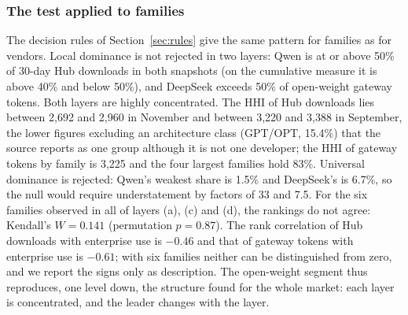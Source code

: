 \documentclass[11pt]{article}
\begin{document}
\subsubsection{The test applied to families} The decision rules of Section~\ref{sec:rules} give the same pattern for families as for vendors. Local dominance is not rejected in two layers: Qwen is at or above 50\% of 30-day Hub downloads in both snapshots (on the cumulative measure it is above 40\% and below 50\%), and DeepSeek exceeds 50\% of open-weight gateway tokens. Both layers are highly concentrated. The HHI of Hub downloads lies between 2{,}692 and 2{,}960 in November and between 3{,}220 and 3{,}388 in September, the lower figures excluding an architecture class (GPT/OPT, 15.4\%) that the source reports as one group although it is not one developer; the HHI of gateway tokens by family is 3{,}225 and the four largest families hold 83\%. Universal dominance is rejected: Qwen's weakest share is 1.5\% and DeepSeek's is 6.7\%, so the null would require understatement by factors of 33 and 7.5. For the six families observed in all of layers (a), (c) and (d), the rankings do not agree: Kendall's $W=0.141$ (permutation $p=0.87$). The rank correlation of Hub downloads with enterprise use is $-0.46$ and that of gateway tokens with enterprise use is $-0.61$; with six families neither can be distinguished from zero, and we report the signs only as description. The open-weight segment thus reproduces, one level down, the structure found for the whole market: each layer is concentrated, and the leader changes with the layer.
\end{document}
